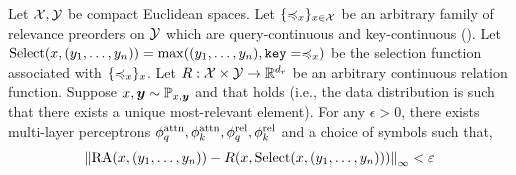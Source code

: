 \begin{theorem*}%
  Let ${\mathcal{X}}, {\mathcal{Y}}$ be compact Euclidean spaces. Let $\{\preccurlyeq_x\}_{x \in {\mathcal{X}}}$ be an arbitrary family of relevance preorders on ${\mathcal{Y}}$ which are query-continuous and key-continuous (). Let $\mathrm{Select}(x, (y_1, \ldots, y_n)) = \max((y_1, \ldots, y_n), \mathtt{key}=\preccurlyeq_x)$ be the selection function associated with $\{\preccurlyeq_x\}_{x}$. Let $R: {\mathcal{X}} \times {\mathcal{Y}} \to \mathbb{R}^{d_r}$ be an arbitrary continuous relation function. Suppose $x, \bm{y} \sim {\mathbb{P}}_{x, \bm{y}}$ and that  holds (i.e., the data distribution is such that there exists a unique most-relevant element). For any $\epsilon > 0$, there exists multi-layer perceptrons $\phi_q^{\mathrm{attn}}, \phi_k^{\mathrm{attn}}, \phi_q^{\mathrm{rel}}, \phi_k^{\mathrm{rel}}$ and a choice of symbols such that,
  \begin{equation*}
    \left\lVert\mathrm{RA}(x, (y_1, \ldots, y_n)) - R(x, \mathrm{Select}(x, (y_1, \ldots, y_n)))\right\rVert_{\infty} < \varepsilon
  \end{equation*}
\end{theorem*}

